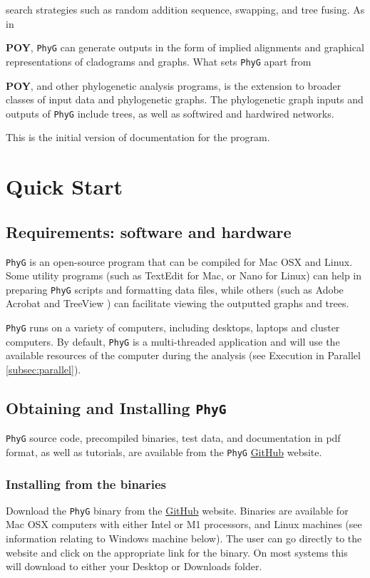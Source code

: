 \documentclass[11pt]{book}
\newcommand{\phyg}{\texttt{PhyG} }
\begin{document}
	search strategies such as random addition sequence, swapping, and tree fusing. As in {\textbf{POY}, 
	\phyg can generate outputs in the form of implied alignments and graphical representations of 
	cladograms and graphs. What sets \phyg apart from {\textbf{POY}, and other phylogenetic 
	analysis programs, is the extension to broader classes of input data and phylogenetic graphs. 
	The phylogenetic graph inputs and outputs of \texttt{PhyG} include trees, as well as softwired 
	and hardwired networks.
		
	This is the initial version of documentation for the program.

\section{Quick Start}
	
	\subsection{Requirements: software and hardware}
		\phyg is an open-source program that can be compiled for Mac OSX and Linux. Some 
		utility programs (such as TextEdit for Mac, or Nano for Linux) can help in preparing 
		\phyg scripts and formatting data files, while others (such as Adobe Acrobat and TreeView 
		\citep{page1996}) can facilitate viewing the outputted graphs and trees.
		
		\phyg runs on a variety of computers, including desktops, laptops and cluster computers.
		By default, \phyg is a multi-threaded application and will use the available resources of 
		the computer during the analysis (see Execution in Parallel \ref{subsec:parallel}). 
		
	\subsection{Obtaining and Installing \phyg}
		\phyg source code, precompiled binaries, test data, and documentation in pdf format, 
		as well as tutorials, are available from the \phyg \href{https://github.com/amnh/PhyGraph}{GitHub} 
		website.

	\subsubsection{Installing from the binaries}
		Download the \phyg binary from the \href{https://github.com/amnh/PhyGraph}{GitHub} 
		website. Binaries are available for Mac OSX computers with either Intel or M1 processors, 
		and Linux machines (see information relating to Windows machine below).
		The user can go directly to the website and click on the appropriate link 
		for the binary. On most systems this will download to either your Desktop or Downloads folder. \\
		
}}
\end{document}
